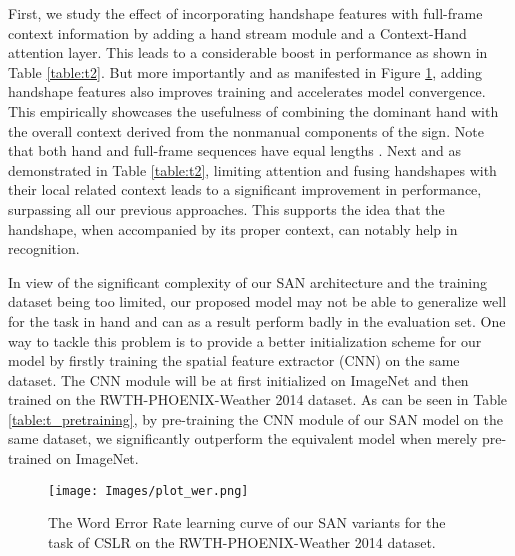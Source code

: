 \documentclass[a4paper,conference]{IEEEtran}
\begin{document}
First, we study the effect of incorporating handshape features with full-frame context information by adding a hand stream module and a Context-Hand attention layer. 
This leads to a considerable boost in performance as shown in Table \ref{table:t2}. But more importantly and as manifested in Figure \ref{fig:learning_curve}, adding handshape features also improves training and accelerates model convergence. This empirically showcases the usefulness of combining the dominant hand with the overall context derived from the nonmanual components of the sign.
Note that both hand and full-frame sequences have equal lengths . Next and as demonstrated in Table \ref{table:t2}, limiting attention and fusing handshapes with their local related context leads to a significant improvement in performance, surpassing all our previous approaches. This supports the idea that the handshape, when accompanied by its proper context, can notably help in recognition.
















In view of the significant complexity of our SAN architecture and the training dataset being too limited, our proposed model may not be able to generalize well for the task in hand and can as a result perform badly in the evaluation set. One way to tackle this problem is to provide a better initialization scheme for our model by firstly training the spatial feature extractor (CNN) on the same dataset. The CNN module will be at first initialized on ImageNet and then trained on the RWTH-PHOENIX-Weather 2014 dataset. As can be seen in Table \ref{table:t_pretraining}, by pre-training the CNN module of our SAN model on the same dataset, we significantly outperform the equivalent model when merely pre-trained on ImageNet.

\begin{figure}[t]
    \centering
    \texttt{[image: Images/plot\_wer.png]}

    \caption{The Word Error Rate learning curve of our SAN variants for the task of CSLR on the RWTH-PHOENIX-Weather 2014 dataset.}
    \label{fig:learning_curve}
\end{figure}
\end{document}
